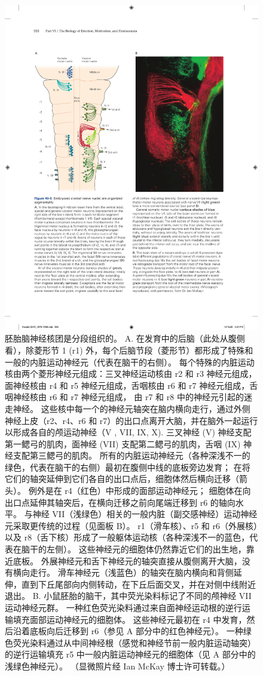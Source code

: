 \begin{figure}[htbp]
	\centering
	\includegraphics[width=0.9\linewidth]{chap40/fig_40_5}
	\caption{胚胎脑神经核团是分段组织的。 A. 在发育中的后脑（此处从腹侧看），除菱形节 1 (r1) 外，每个后脑节段（菱形节）都形成了特殊和一般的内脏运动神经元（代表在脑干的右侧）。 每个特殊的内脏运动核由两个菱形神经元组成：三叉神经运动核由 r2 和 r3 神经元组成，面神经核由 r4 和 r5 神经元组成，舌咽核由 r6 和 r7 神经元组成，舌咽神经核由 r6 和 r7 神经元组成， 由 r7 和 r8 中的神经元引起的迷走神经。 这些核中每一个的神经元轴突在脑内横向走行，通过外侧神经上皮（r2、r4、r6 和 r7）的出口点离开大脑，并在脑外一起运行以形成各自的颅运动神经（V , VII, IX, X). 三叉神经 (V) 神经支配第一鳃弓的肌肉，面神经 (VII) 支配第二鳃弓的肌肉，舌咽 (IX) 神经支配第三鳃弓的肌肉。 所有的内脏运动神经元（各种深浅不一的绿色，代表在脑干的右侧）最初在腹侧中线的底板旁边发育； 在将它们的轴突延伸到它们各自的出口点后，细胞体然后横向迁移（箭头）。 例外是在 r4（红色）中形成的面部运动神经元； 细胞体在向出口点延伸其轴突后，在横向迁移之前向尾端迁移到 r6 的轴向水平。 与神经 VII（浅绿色）相关的一般内脏（副交感神经）运动神经元采取更传统的过程（见面板 B）。 r1（滑车核）、r5 和 r6（外展核）以及 r8（舌下核）形成了一般躯体运动核（各种深浅不一的蓝色，代表在脑干的左侧）。 这些神经元的细胞体仍然靠近它们的出生地，靠近底板。 外展神经元和舌下神经元的轴突直接从腹侧离开大脑，没有横向走行。 滑车神经元（浅蓝色）的轴突在脑内横向和背侧延伸，直到下丘尾部向内侧转动，在下丘后面交叉，并在对侧中线附近退出。 B. 小鼠胚胎的脑干，其中荧光染料标记了不同的颅神经 VII 运动神经元群。 一种红色荧光染料通过来自面神经运动根的逆行运输填充面部运动神经元的细胞体。 这些神经元最初在 r4 中发育，然后沿着底板向后迁移到 r6（参见 A 部分中的红色神经元）。 一种绿色荧光染料通过从中间神经根（感觉和神经节前一般内脏运动轴突）的逆行运输填充 r5 中一般内脏运动神经元的细胞体（见 A 部分中的浅绿色神经元）。 （显微照片经 Ian McKay 博士许可转载。）}
	\label{fig:40_5}
\end{figure}


